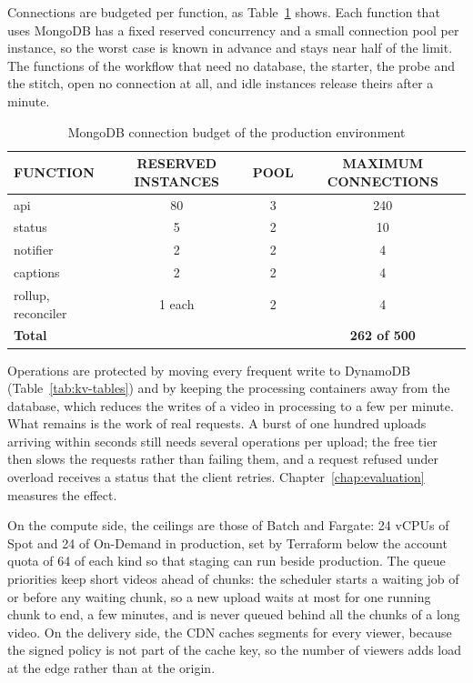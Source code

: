 Connections are budgeted per function, as Table~\ref{tab:connection-budget} shows. Each function
that uses MongoDB has a fixed reserved concurrency and a small connection pool per instance, so the
worst case is known in advance and stays near half of the limit. The functions of the workflow that
need no database, the starter, the probe and the stitch, open no connection at all, and idle
instances release theirs after a minute.

\begin{table}[H]
\centering
\caption{MongoDB connection budget of the production environment}
\label{tab:connection-budget}
\small
\begin{tabular}{l c c c}
\toprule
\textbf{FUNCTION} & \textbf{RESERVED INSTANCES} & \textbf{POOL} & \textbf{MAXIMUM CONNECTIONS} \\
\midrule
api & 80 & 3 & 240 \\
status & 5 & 2 & 10 \\
notifier & 2 & 2 & 4 \\
captions & 2 & 2 & 4 \\
rollup, reconciler & 1 each & 2 & 4 \\
\midrule
\textbf{Total} & & & \textbf{262 of 500} \\
\bottomrule
\end{tabular}
\end{table}

Operations are protected by moving every frequent write to DynamoDB (Table~\ref{tab:kv-tables}) and
by keeping the processing containers away from the database, which reduces the writes of a video
in processing to a few per minute. What remains is the work of real requests. A burst of one hundred
uploads arriving within seconds still needs several operations per upload; the free tier then slows
the requests rather than failing them, and a request refused under overload receives a status that
the client retries. Chapter~\ref{chap:evaluation} measures the effect.

On the compute side, the ceilings are those of Batch and Fargate: 24 vCPUs of Spot and 24 of
On-Demand in production, set by Terraform below the account quota of 64 of each kind so that staging
can run beside production. The queue priorities keep short videos ahead of chunks: the scheduler starts a
waiting job of  or  before any waiting chunk, so a new upload waits at most for one running
chunk to end, a few minutes, and is never queued behind all the chunks of a long video. On the delivery side, the CDN
caches segments for every viewer, because the signed policy is not part of the cache key, so the
number of viewers adds load at the edge rather than at the origin.
